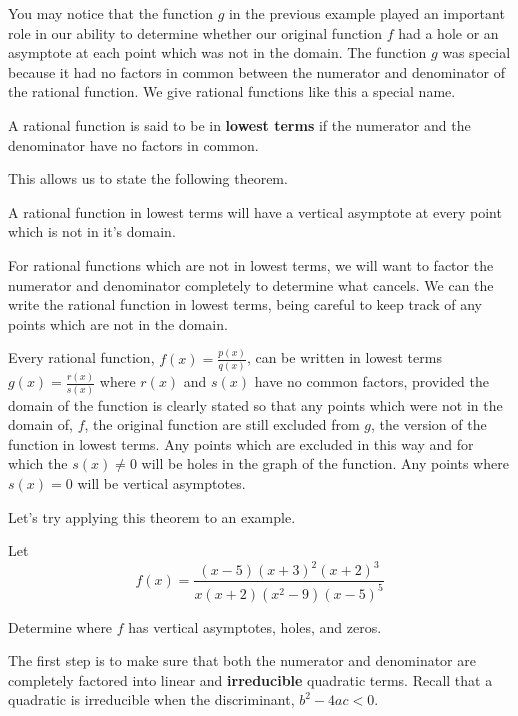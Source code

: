 \documentclass{ximera}
\begin{document}
You may notice that the function $g$ in the previous example played an important role in our ability to determine whether our original function $f$ had a hole or an asymptote at each point which was not in the domain.  The function $g$ was special because it had no factors in common between the numerator and denominator of the rational function.  We give rational functions like this a special name. 

\begin{definition}  
A rational function is said to be in \textbf{lowest terms} if the numerator and the denominator have no factors in common.
\end{definition}

This allows us to state the following theorem.

\begin{theorem}
A rational function in lowest terms will have a vertical asymptote at every point which is not in it's domain.
\end{theorem}

For rational functions which are not in lowest terms, we will want to factor the numerator and denominator completely to determine what cancels.  We can the write the rational function in lowest terms, being careful to keep track of any points which are not in the domain.  

\begin{theorem}
Every rational function, $f(x)=\frac{p(x)}{q(x)}$, can be written in lowest terms $g(x)=\frac{r(x)}{s(x)}$ where $r(x)$ and $s(x)$ have no common factors, provided the domain of the function is clearly stated so that any points which were not in the domain of, $f$, the original function are still excluded from $g$, the version of the function in lowest terms.  Any points which are excluded in this way and for which the  $s(x) \neq 0$ will be holes in the graph of the function.  Any points where $s(x)=0$ will be vertical asymptotes.
\end{theorem}

Let's try applying this theorem to an example.

\begin{example}
 Let $$f(x)=\frac{(x-5)(x+3)^2(x+2)^3}{x(x+2)(x^2-9)(x-5)^5}$$

Determine where $f$ has vertical asymptotes, holes, and zeros.
\begin{explanation}
The first step is to make sure that both the numerator and denominator are completely factored into linear and \textbf{irreducible} quadratic terms.  Recall that a quadratic is irreducible when the discriminant, $b^2-4ac<0$.
\end{explanation}
\end{example}
\end{document}
